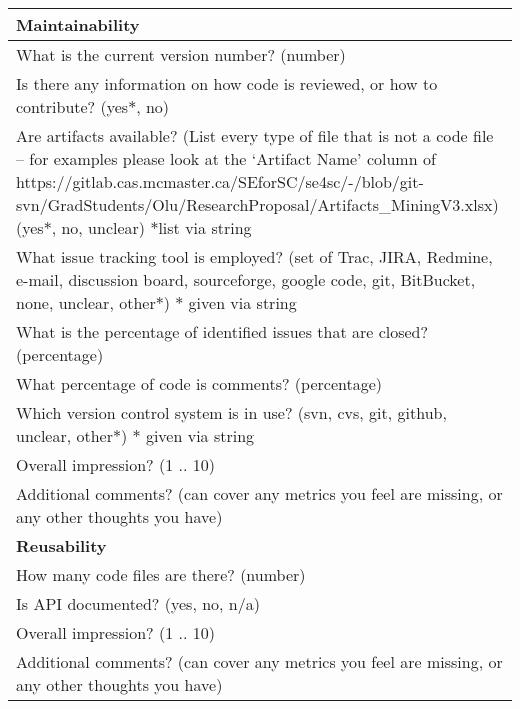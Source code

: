 \begin{table}[H]
\begin{tabular}{p{14cm}}
\hline	
\textbf{Maintainability}\\
\hline
What is the current version number? (number)\\
Is there any information on how code is reviewed, or how to contribute? ({yes$\ast$, no})\\
Are artifacts available? (List every type of file that is not a code file – for examples please look at the ‘Artifact Name’ column of https://gitlab.cas.mcmaster.ca/SEforSC/se4sc/-/blob/git-svn/GradStudents/Olu/ResearchProposal/Artifacts\_MiningV3.xlsx) ({yes$\ast$, no, unclear}) $\ast$list via string\\
What issue tracking tool is employed? (set of {Trac, JIRA, Redmine, e-mail, discussion board, sourceforge, google code, git, BitBucket, none, unclear, other$\ast$}) $\ast$ given via string\\
What is the percentage of identified issues that are closed? (percentage)\\
What percentage of code is comments? (percentage)\\
Which version control system is in use? ({svn, cvs, git, github, unclear, other$\ast$}) $\ast$ given via string\\
Overall impression? ({1 .. 10})\\
Additional comments? (can cover any metrics you feel are missing, or any other thoughts you have)\\
\hline
\textbf{Reusability}\\
\hline
How many code files are there? (number)\\
Is API documented? ({yes, no, n/a})\\
Overall impression? ({1 .. 10})\\
Additional comments? (can cover any metrics you feel are missing, or any other thoughts you have)\\
\hline\end{tabular}
\end{table}

\begin{table}[H]
\begin{tabular}{p{14cm}}
\end{tabular}
\end{table}

